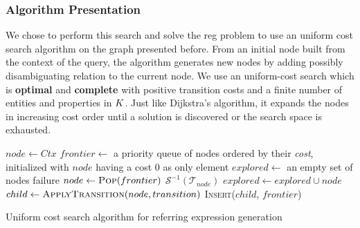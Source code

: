 \documentclass[a4paper,11pt,twoside]{StyleThese}
\begin{document}
\subsubsection{Algorithm Presentation}
We chose to perform this search and solve the \acrshort{reg} problem to use an uniform cost search algorithm on the graph presented before.
From an initial node built from the context of the query, the algorithm generates new nodes by adding possibly disambiguating relation to the current node. We use an uniform-cost search which is \textbf{optimal} and \textbf{complete} with positive transition costs and a finite number of entities and properties in $K$. Just like Dijkstra's algorithm, it expands the nodes in increasing cost order until a solution is discovered or the search space is exhausted.


\begin{algorithm}[H]
\begin{algorithmic}[1]
\State $node \leftarrow Ctx$
\State $frontier \leftarrow$ a priority queue of nodes ordered by their \textit{cost}, initialized with $node$ having a cost 0 as only element
\State $explored \leftarrow$ an empty set of nodes
\Loop
		\State \Return failure		
	\EndIf
	\State $node \leftarrow \textsc{Pop}(frontier)$
		\State \Return $\mathcal{S}^{-1}(\mathcal{T}_{node})$
	\EndIf
	\State $explored \leftarrow explored \cup node$
		\State $child \leftarrow \textsc{ApplyTransition}(node, transition)$
			\State \textsc{Insert}($child$, $frontier$)
		\EndIf
	\EndFor
\EndLoop
\EndFunction
\end{algorithmic}
 \caption{Uniform cost search algorithm for referring expression generation}
 \label{alg:reg}
\end{algorithm}
\end{document}
